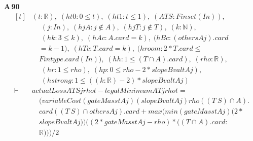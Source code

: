 \noindent\textbf{A\,90}\quad{}
{\footnotesize\[ \begin{aligned}[t]
&(\mathit{t} : \mathbb{R} ),\; (\mathit{ht0} : 0 \leq \mathit{t}),\; (\mathit{ht1} : \mathit{t} \leq 1),\; (\mathit{A} \mathit{T} \mathit{S} : \mathit{Finset} (\mathit{I} \mathit{n})),\\
&\quad \; (\mathit{j} : \mathit{I} \mathit{n}),\; (\mathit{hjA} : \mathit{j} \notin \mathit{A}),\; (\mathit{hjT} : \mathit{j} \notin \mathit{T}),\; (\mathit{k} : \mathbb{N} ),\\
&\quad \; (\mathit{hk} : 3 \leq \mathit{k}),\; (\mathit{hAc} : \mathit{A}.\mathit{card}=\mathit{k}),\; (\mathit{hBc} : (\mathit{others} \mathit{A} \mathit{j}).\mathit{card}\\
&\quad =\mathit{k}-1),\; (\mathit{hTc} : \mathit{T}.\mathit{card}=\mathit{k}),\; (\mathit{hroom} : 2*\mathit{T}.\mathit{card} \leq\\
&\quad \mathit{Fintype}.\mathit{card} (\mathit{I} \mathit{n})),\; (\mathit{hh} : 1 \leq (\mathit{T} \cap \mathit{A}).\mathit{card}),\; (\mathit{rho} : \mathbb{R} ),\\
&\quad \; (\mathit{hr} : 1 \leq \mathit{rho}),\; (\mathit{hp} : 0 \leq \mathit{rho}-2*\mathit{slopeBval} \mathit{t} \mathit{A} \mathit{j}),\\
&\quad \; (\mathit{hstrong} : 1 \leq ((\mathit{k}:\mathbb{R} )-2)*\mathit{slopeBval} \mathit{t} \mathit{A} \mathit{j})\\
\vdash\;&\mathit{actualLoss} \mathit{A} \mathit{T} \mathit{S} \mathit{j} \mathit{rho} \mathit{t}-\mathit{legalMinimum} \mathit{A} \mathit{T} \mathit{j} \mathit{rho} \mathit{t} =\\
&\quad (\mathit{variableCost} (\mathit{gateMass} \mathit{t} \mathit{A} \mathit{j}) (\mathit{slopeBval} \mathit{t} \mathit{A} \mathit{j}) \mathit{rho} ((\mathit{T} \ \mathit{S}) \cap \mathit{A}).\\
&\quad \mathit{card} ((\mathit{T} \ \mathit{S}) \cap \mathit{others} \mathit{A} \mathit{j}).\mathit{card}+ \mathit{max} (\mathit{min} (\mathit{gateMass} \mathit{t} \mathit{A} \mathit{j}) (2*\\
&\quad \mathit{slopeBval} \mathit{t} \mathit{A} \mathit{j})) ((2*\mathit{gateMass} \mathit{t} \mathit{A} \mathit{j}-\mathit{rho})*((\mathit{T} \cap \mathit{A}).\mathit{card}:\\
&\quad \mathbb{R} )))/2
\end{aligned} \]}

